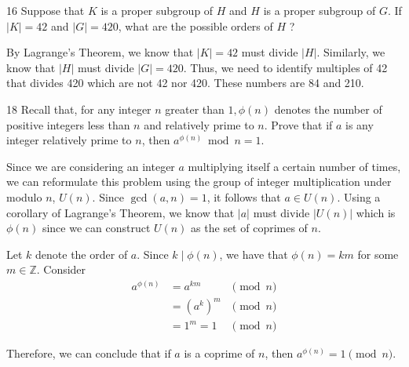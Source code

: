 \begin{hwproblem}
{16}{
    Suppose that $K$ is a proper subgroup of $H$ and $H$ is a proper subgroup of $G$. If $|K|=42$ and $|G|=420$, what are the possible orders of $H$ ?
}

By Lagrange's Theorem, we know that \(|K| = 42\) must divide \(|H|\). Similarly, we know that \(|H|\) must divide \(|G| = 420\). Thus, we need to identify multiples of 42 that divides 420 which are not 42 nor 420. These numbers are 84 and 210.
\end{hwproblem}

\begin{hwproblem}
{18}{
    Recall that, for any integer $n$ greater than $1, \phi(n)$ denotes the number of positive integers less than $n$ and relatively prime to $n$. Prove that if $a$ is any integer relatively prime to $n$, then $a^{\phi(n)} \bmod n=1$.
}

Since we are considering an integer \(a\) multiplying itself a certain number of times, we can reformulate this problem using the group of integer multiplication under modulo \(n\), \(U(n)\). Since \(\gcd(a, n) = 1\), it follows that \(a \in U(n)\). Using a corollary of Lagrange's Theorem, we know that \(|a|\) must divide \(|U(n)|\) which is \(\phi(n)\) since we can construct \(U(n)\) as the set of coprimes of \(n\).

Let \(k\) denote the order of \(a\). Since \(k \mid \phi(n)\), we have that \(\phi(n) = km\) for some \(m \in \mathbb{Z}\). Consider
\[
\begin{aligned}
    a^{\phi(n)} &= a^{km} &\pmod n \\
                &= (a^k)^m &\pmod n \\
                &= 1^m = 1 &\pmod n
\end{aligned}
\]

Therefore, we can conclude that if \(a\) is a coprime of \(n\), then \(a^{\phi(n)} = 1 \pmod n\).
\end{hwproblem}
